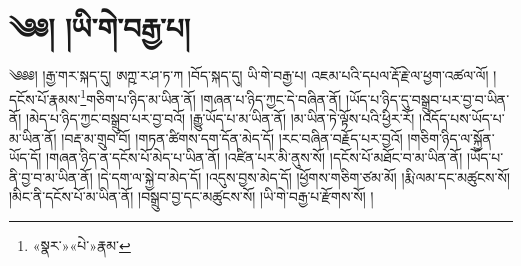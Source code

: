 \chapter{༄༅། །ཡི་གེ་བརྒྱ་པ།}༄༅༅། །རྒྱ་གར་སྐད་དུ། ཨཀྵ་ར་ཤ་ཏ་ཀ །བོད་སྐད་དུ། ཡི་གེ་བརྒྱ་པ། འཇམ་པའི་དཔལ་རྡོ་རྗེ་ལ་ཕྱག་འཚལ་ལོ། །དངོས་པོ་རྣམས་\footnote{«སྣར་»«པེ་»རྣམ་}གཅིག་པ་ཉིད་མ་ཡིན་ནོ། །གཞན་པ་ཉིད་ཀྱང་དེ་བཞིན་ནོ། །ཡོད་པ་ཉིད་དུ་བསྒྲུབ་པར་བྱ་བ་ཡིན་ནོ། །མེད་པ་ཉིད་ཀྱང་བསྒྲུབ་པར་བྱ་བའོ། །རྒྱུ་ཡོད་པ་མ་ཡིན་ནོ། །མ་ཡིན་ཏེ་ལྟོས་པའི་ཕྱིར་རོ། །འདོད་པས་ཡོད་པ་མ་ཡིན་ནོ། །བརྡ་མ་གྲུབ་བོ། །གཏན་ཚིགས་དག་དོན་མེད་དོ། །རང་བཞིན་བརྗོད་པར་བྱའོ། །གཅིག་ཉིད་ལ་སྐྱོན་ཡོད་དོ། །གཞན་ཉིད་ན་དངོས་པོ་མེད་པ་ཡིན་ནོ། །འཛིན་པར་མི་ནུས་སོ། །དངོས་པོ་མཐོང་བ་མ་ཡིན་ནོ། །ཡོད་པ་ནི་བྱ་བ་མ་ཡིན་ནོ། །དེ་དག་ལ་སྐྱེ་བ་མེད་དོ། །འདུས་བྱས་མེད་དོ། །ཕྱོགས་གཅིག་ཙམ་མོ། །རྨི་ལམ་དང་མཚུངས་སོ། །མིང་ནི་དངོས་པོ་མ་ཡིན་ནོ། །བསྒྲུབ་བྱ་དང་མཚུངས་སོ། །ཡི་གེ་བརྒྱ་པ་རྫོགས་སོ། ། 